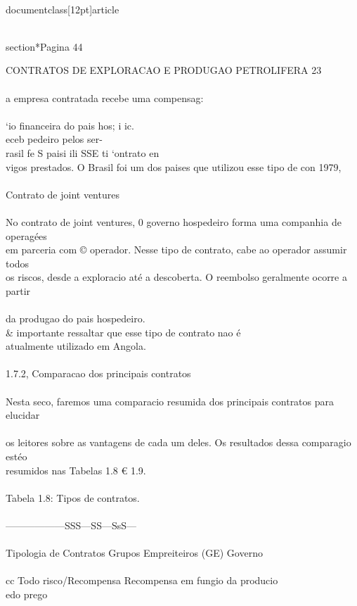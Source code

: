 \\documentclass[12pt]{article}
\begin{document}
\\section*{Pagina 44}

CONTRATOS DE EXPLORACAO E PRODUGAO PETROLIFERA 23\\
\\
a empresa contratada recebe uma compensag:\\
\\
‘io financeira do pais hos; i ic.\\
eceb pedeiro pelos ser-\\
rasil fe S paisi ili SSE ti ‘ontrato en\\
vigos prestados. O Brasil foi um dos paises que utilizou esse tipo de con 1979,\\
\\
Contrato de joint ventures\\
\\
No contrato de joint ventures, 0 governo hospedeiro forma uma companhia de operagées\\
em parceria com © operador. Nesse tipo de contrato, cabe ao operador assumir todos\\
os riscos, desde a exploracio até a descoberta. O reembolso geralmente ocorre a partir\\
\\
da produgao do pais hospedeiro. \\& importante ressaltar que esse tipo de contrato nao é\\
atualmente utilizado em Angola.\\
\\
1.7.2, Comparacao dos principais contratos\\
\\
Nesta seco, faremos uma comparacio resumida dos principais contratos para elucidar\\
\\
os leitores sobre as vantagens de cada um deles. Os resultados dessa comparagio estéo\\
resumidos nas Tabelas 1.8 € 1.9.\\
\\
Tabela 1.8: Tipos de contratos.\\
\\
——————SSS—SS—SsS—\\
\\
Tipologia de Contratos Grupos Empreiteiros (GE) Governo\\
\\
cc Todo risco/Recompensa Recompensa em fungio da producio\\
edo prego\\
\end{document}
